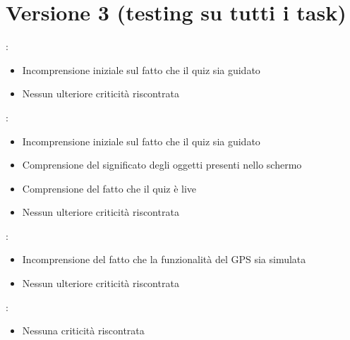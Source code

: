 \documentclass{article}
\begin{document}
\section{Versione 3 (testing su tutti i task)}
\begin{description}
\addtolength{\itemindent}{0.5cm}
\item [Quiz giornaliero] :
\begin{itemize}
\item Incomprensione iniziale sul fatto che il quiz sia guidato
\item Nessun ulteriore criticità riscontrata
\end{itemize}
\item [Quiz settimanale] :
\begin{itemize}
\item Incomprensione iniziale sul fatto che il quiz sia guidato
\item Comprensione del significato degli oggetti presenti nello schermo
\item Comprensione del fatto che il quiz è live
\item Nessun ulteriore criticità riscontrata
\end{itemize}
\item [Bacheca] :
\begin{itemize}
\item Incomprensione del fatto che la funzionalità del GPS sia simulata
\item Nessun ulteriore criticità riscontrata
\end{itemize}
 
\item [Shop] :
\begin{itemize}
\item Nessuna criticità riscontrata
\end{itemize}
\end{description}
\end{document}
